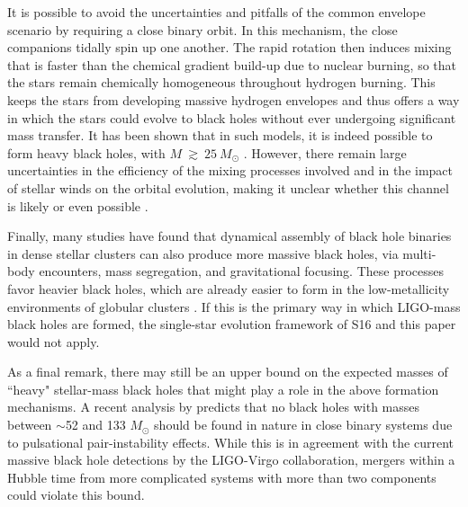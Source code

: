 \documentclass[]{emulateapj}
\newcommand{\Ms}{M_{\odot}}
\begin{document}
It is possible to avoid the uncertainties and pitfalls of the common envelope scenario by requiring a close binary orbit. In this mechanism, the close companions tidally spin up one another. The rapid rotation then induces mixing that is faster than the chemical gradient build-up due to nuclear burning, so that the stars remain chemically homogeneous throughout hydrogen burning. This keeps the stars from developing massive hydrogen envelopes and thus offers a way in which the stars could evolve to black holes without ever undergoing significant mass transfer. It has been shown that in such models, it is indeed possible to form heavy black holes, with $M~\gtrsim~25~\Ms$  \citep{de-Mink2016, Mandel2016, Marchant2016}. However, there remain large uncertainties in the efficiency of the mixing processes involved and in the impact of stellar winds on the orbital evolution, making it unclear whether this channel is likely or even possible \citep{Mandel2016}. 

Finally, many studies have found that dynamical assembly of black hole binaries in dense stellar clusters can also produce more massive black holes, via multi-body encounters, mass segregation, and gravitational focusing. These processes favor heavier black holes, which are already easier to form in the low-metallicity environments of globular clusters \citep{Mapelli2016,OLeary2016,Rodriguez2016, Askar2017, Park2017}. If this is the primary way in which LIGO-mass black holes are formed, the single-star evolution framework of S16 and this paper would not apply.

As a final remark, there may still be an upper bound on the expected masses of ``heavy" stellar-mass black holes that might play a role in the above formation mechanisms. A recent analysis by \citet{Woosley2017} predicts that no black holes with masses between $\sim$52 and 133 $\Ms$ should be found in nature in close binary systems due to pulsational pair-instability effects. While this is in agreement with the current massive black hole detections by the LIGO-Virgo collaboration, mergers within a Hubble time from more complicated systems with more than two components could violate this bound.
\end{document}
